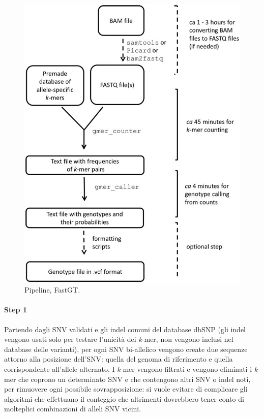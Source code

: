 \documentclass[../main.tex]{subfiles}
\begin{document}
 \begin{figure}[h!]
	\centering
  	\captionsetup{justification=centering}
  	\includegraphics[scale=.25]{images/fastgt-pipeline.jpg}
  	\caption{Pipeline, FastGT.}
  	\label{fig:fastgt}
\end{figure}

\paragraph{Step 1} Partendo dagli SNV validati e gli indel comuni del database dbSNP (gli indel vengono usati solo per testare l'unicità dei \textit{k}-mer, non vengono inclusi nel database delle varianti), per ogni SNV bi-allelico vengono create due sequenze attorno alla posizione dell'SNV: quella del genoma di riferimento e quella corrispondente all'allele alternato. I \textit{k}-mer vengono filtrati e vengono eliminati i \textit{k}-mer che coprono un determinato SNV e che contengono altri SNV o indel noti, per rimuovere ogni possibile sovrapposizione: si vuole evitare di complicare gli algoritmi che effettuano il conteggio che altrimenti dovrebbero tener conto di molteplici combinazioni di alleli SNV vicini. 
\end{document}
